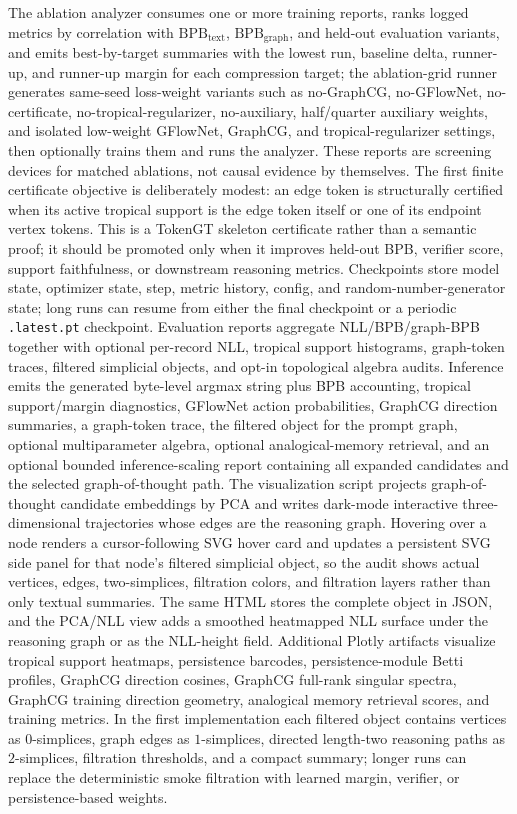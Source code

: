 \documentclass[11pt]{article}
\begin{document}
The ablation analyzer consumes one or more training reports, ranks logged metrics by correlation with \(\mathrm{BPB}_{\mathrm{text}}\), \(\mathrm{BPB}_{\mathrm{graph}}\), and held-out evaluation variants, and emits best-by-target summaries with the lowest run, baseline delta, runner-up, and runner-up margin for each compression target; the ablation-grid runner generates same-seed loss-weight variants such as no-GraphCG, no-GFlowNet, no-certificate, no-tropical-regularizer, no-auxiliary, half/quarter auxiliary weights, and isolated low-weight GFlowNet, GraphCG, and tropical-regularizer settings, then optionally trains them and runs the analyzer.  These reports are screening devices for matched ablations, not causal evidence by themselves.  The first finite certificate objective is deliberately modest: an edge token is structurally certified when its active tropical support is the edge token itself or one of its endpoint vertex tokens.  This is a TokenGT skeleton certificate rather than a semantic proof; it should be promoted only when it improves held-out BPB, verifier score, support faithfulness, or downstream reasoning metrics.  Checkpoints store model state, optimizer state, step, metric history, config, and random-number-generator state; long runs can resume from either the final checkpoint or a periodic \texttt{.latest.pt} checkpoint.  Evaluation reports aggregate NLL/BPB/graph-BPB together with optional per-record NLL, tropical support histograms, graph-token traces, filtered simplicial objects, and opt-in topological algebra audits.  Inference emits the generated byte-level argmax string plus BPB accounting, tropical support/margin diagnostics, GFlowNet action probabilities, GraphCG direction summaries, a graph-token trace, the filtered object for the prompt graph, optional multiparameter algebra, optional analogical-memory retrieval, and an optional bounded inference-scaling report containing all expanded candidates and the selected graph-of-thought path.  The visualization script projects graph-of-thought candidate embeddings by PCA and writes dark-mode interactive three-dimensional trajectories whose edges are the reasoning graph.  Hovering over a node renders a cursor-following SVG hover card and updates a persistent SVG side panel for that node's filtered simplicial object, so the audit shows actual vertices, edges, two-simplices, filtration colors, and filtration layers rather than only textual summaries.  The same HTML stores the complete object in JSON, and the PCA/NLL view adds a smoothed heatmapped NLL surface under the reasoning graph or as the NLL-height field.  Additional Plotly artifacts visualize tropical support heatmaps, persistence barcodes, persistence-module Betti profiles, GraphCG direction cosines, GraphCG full-rank singular spectra, GraphCG training direction geometry, analogical memory retrieval scores, and training metrics.  In the first implementation each filtered object contains vertices as \(0\)-simplices, graph edges as \(1\)-simplices, directed length-two reasoning paths as \(2\)-simplices, filtration thresholds, and a compact summary; longer runs can replace the deterministic smoke filtration with learned margin, verifier, or persistence-based weights.
\end{document}

